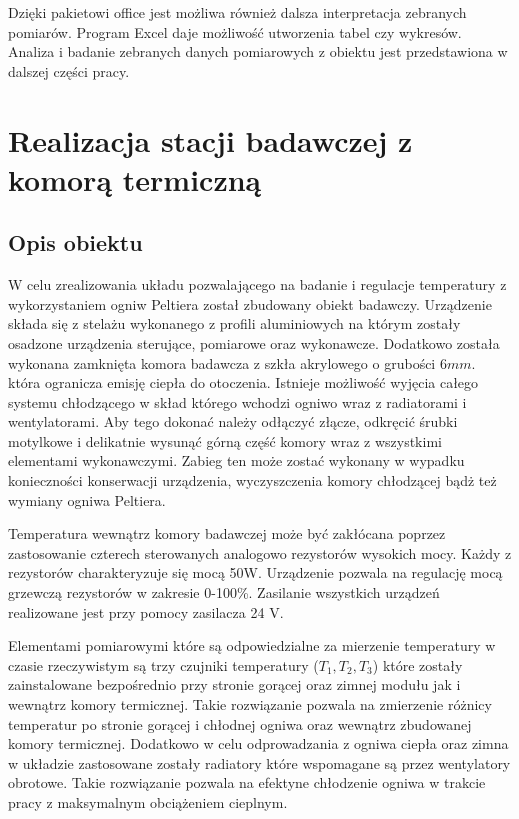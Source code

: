 \documentclass[oneside]{mgr}
\begin{document}
Dzięki pakietowi office jest możliwa również dalsza interpretacja zebranych pomiarów. Program Excel daje możliwość utworzenia tabel czy wykresów. Analiza i badanie zebranych danych pomiarowych z obiektu jest przedstawiona w dalszej części pracy.

\chapter{Realizacja stacji badawczej z komorą termiczną}
\section{Opis obiektu}

W celu zrealizowania układu pozwalającego na badanie i regulacje temperatury z wykorzystaniem ogniw Peltiera został zbudowany obiekt badawczy. Urządzenie składa się z stelażu wykonanego z profili aluminiowych na którym zostały osadzone urządzenia sterujące, pomiarowe oraz wykonawcze. Dodatkowo została wykonana zamknięta komora badawcza z szkła akrylowego o grubości 6$mm$. która ogranicza emisję ciepła do otoczenia. Istnieje możliwość wyjęcia całego systemu chłodzącego w skład którego wchodzi ogniwo wraz z radiatorami i wentylatorami. Aby tego dokonać należy odłączyć złącze, odkręcić śrubki motylkowe i delikatnie wysunąć górną część komory wraz z wszystkimi elementami wykonawczymi. Zabieg ten może zostać wykonany w wypadku konieczności konserwacji urządzenia, wyczyszczenia komory chłodzącej bądż też wymiany ogniwa Peltiera. 

Temperatura wewnątrz komory badawczej może być zakłócana poprzez zastosowanie czterech sterowanych analogowo rezystorów wysokich mocy. Każdy z rezystorów charakteryzuje się mocą 50W. Urządzenie pozwala na regulację mocą grzewczą rezystorów w zakresie 0-100\%. Zasilanie wszystkich urządzeń realizowane jest przy pomocy zasilacza 24 V.

Elementami pomiarowymi które są odpowiedzialne za mierzenie temperatury  w czasie rzeczywistym są trzy czujniki temperatury ($T_1, T_2, T_3$) które zostały zainstalowane bezpośrednio przy stronie gorącej oraz zimnej modułu jak i wewnątrz komory termicznej. Takie rozwiązanie pozwala na zmierzenie różnicy temperatur po stronie gorącej i chłodnej ogniwa oraz wewnątrz zbudowanej komory termicznej. Dodatkowo w celu odprowadzania z ogniwa ciepła oraz zimna w układzie zastosowane zostały radiatory które wspomagane są przez wentylatory obrotowe. Takie rozwiązanie pozwala na efektyne chłodzenie ogniwa w trakcie pracy z maksymalnym obciążeniem cieplnym.
\end{document}
